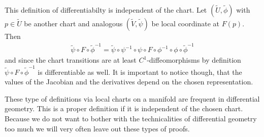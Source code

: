 \documentclass[12pt,a4paper]{article}
\numberwithin{equation}{subsection}
\numberwithin{lemma}{subsection}
\theoremstyle{definition}
\begin{document}
This definition of differentiabilty is independent of the chart. 
Let $(\tilde{U},\tilde{\phi})$ with $p \in \tilde{U}$ be 
another chart and analogous $(\tilde{V},\tilde{\psi})$ be local coordinate 
at $F(p)$.
Then 
\begin{align*}
    \tilde{\psi} \circ F \circ \tilde{\phi}^{-1} 
    = \tilde{\psi} \circ \psi^{-1} \circ \psi \circ F \circ \phi^{-1} \circ \phi \circ \tilde{\phi}^{-1}
\end{align*}
and since the chart transitions are at least $C^1$-diffeomorphisms by definition
$\tilde{\psi} \circ F \circ \tilde{\phi}^{-1} $ is differentiable as well.
It is important to notice though, that the values of the Jacobian 
and the derivatives depend on the chosen representation.

These type of definitions via local charts on a manifold are frequent in
differential geometry. This is a proper definition if it is independent of the 
chosen chart. Because we do not want to bother with the technicalities of 
differential geometry too much we will very often leave out these types of
proofs.  
\end{document}
